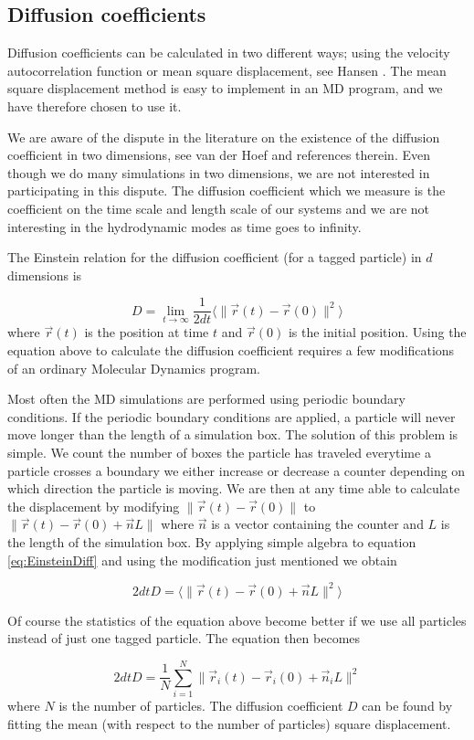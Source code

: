 \subsection{Diffusion coefficients}
\label{sect:CalcDiffCoeff}
Diffusion coefficients can be calculated in two different ways; using
the velocity autocorrelation function or mean square
displacement, see \eg Hansen \etal \cite{Hansen86}. The mean square
displacement method is easy to implement in an MD program, and we have
therefore chosen to use it.

We are aware of the dispute in the literature on the existence of the
diffusion coefficient in two dimensions, see \eg van der Hoef \etal
\cite{Hoef91} and references therein. Even though we do many
simulations in two dimensions, we are not interested in participating
in this dispute. The diffusion coefficient which we measure is the
coefficient on the time scale and length scale of our systems and we
are not interesting in the hydrodynamic modes as time goes to infinity.

The Einstein relation for the diffusion coefficient (for a tagged
particle) in $d$ dimensions is \cite{Hansen86} 

\begin{equation}
\label{eq:EinsteinDiff}
  D = \lim_{t \rightarrow \infty} \frac{1}{2d t} \langle
  \|\vec{r}(t)-\vec{r}(0)\|^2 \rangle
\end{equation}
where $\vec{r}(t)$ is the position at time $t$ and $\vec{r}(0)$ is the
initial position. Using the equation above to calculate the diffusion
coefficient requires a few modifications of an ordinary Molecular
Dynamics program. 

Most often the MD simulations are performed using periodic boundary
conditions. If the periodic boundary conditions are applied, a particle
will never move longer than the length of a simulation box. The
solution of this problem is simple. We count the number of boxes the
particle has traveled \ie everytime a particle crosses a boundary we
either increase or decrease a counter depending on which direction the
particle is moving. We are then at any time able to calculate the
displacement by modifying $\|\vec{r}(t)-\vec{r}(0)\|$ to
$\|\vec{r}(t)-\vec{r}(0)+\vec{n}L\|$ where $\vec{n}$ is a vector
containing the counter and $L$ is the length of the simulation
box. By applying simple algebra to equation \eqref{eq:EinsteinDiff}
and using the modification just mentioned we obtain

\begin{equation}
  2dtD = \langle\|\vec{r}(t) - \vec{r}(0) + \vec{n}L\|^2\rangle
\end{equation}

Of course the statistics of the equation above become better if we use
all particles instead of just one tagged particle. The equation then
becomes

\begin{equation}
  2dtD = \frac{1}{N} \sum_{i=1}^N \|\vec{r}_i(t) - \vec{r}_i(0) +
  \vec{n}_iL\|^2 
\end{equation}
where $N$ is the number of particles. The diffusion coefficient $D$
can be found by fitting the mean (with respect to the number of
particles) square displacement. 
